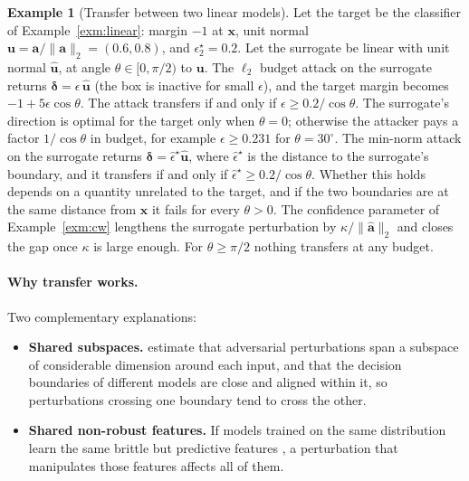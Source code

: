 \documentclass[10pt,a4paper]{extarticle}
\theoremstyle{definition}
\newtheorem{example}{Example}[section]
\newcommand{\x}{\mathbf{x}}
\newcommand{\bdelta}{\boldsymbol{\delta}}
\begin{document}
\begin{example}[Transfer between two linear models]\label{exm:transfer}
Let the target be the classifier of Example~\ref{exm:linear}: margin \(-1\) at \(\x\), unit normal \(\mathbf{u}=\mathbf{a}/\|\mathbf{a}\|_2=(0.6,0.8)\), and \(\epsilon^\star_2=0.2\). Let the surrogate be linear with unit normal \(\hat{\mathbf{u}}\), at angle \(\theta\in[0,\pi/2)\) to \(\mathbf{u}\). The \(\ell_2\) budget attack on the surrogate returns \(\bdelta=\epsilon\,\hat{\mathbf{u}}\) (the box is inactive for small \(\epsilon\)), and the target margin becomes \(-1+5\epsilon\cos\theta\). The attack transfers if and only if \(\epsilon\ge0.2/\cos\theta\). The surrogate's direction is optimal for the target only when \(\theta=0\); otherwise the attacker pays a factor \(1/\cos\theta\) in budget, for example \(\epsilon\ge0.231\) for \(\theta=30^\circ\). The min-norm attack on the surrogate returns \(\bdelta=\hat\epsilon^\star\hat{\mathbf{u}}\), where \(\hat\epsilon^\star\) is the distance to the surrogate's boundary, and it transfers if and only if \(\hat\epsilon^\star\ge0.2/\cos\theta\). Whether this holds depends on a quantity unrelated to the target, and if the two boundaries are at the same distance from \(\x\) it fails for every \(\theta>0\). The confidence parameter of Example~\ref{exm:cw} lengthens the surrogate perturbation by \(\kappa/\|\hat{\mathbf{a}}\|_2\) and closes the gap once \(\kappa\) is large enough. For \(\theta\ge\pi/2\) nothing transfers at any budget.
\end{example}

\paragraph{Why transfer works.} Two complementary explanations:
\begin{itemize}
  \item \textbf{Shared subspaces.} \citet{tramer2017space} estimate that adversarial perturbations span a subspace of considerable dimension around each input, and that the decision boundaries of different models are close and aligned within it, so perturbations crossing one boundary tend to cross the other.
  \item \textbf{Shared non-robust features.} If models trained on the same distribution learn the same brittle but predictive features \citep{ilyas2019features}, a perturbation that manipulates those features affects all of them.
\end{itemize}
\end{document}
